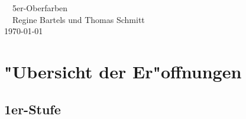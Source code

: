 \newenvironment{reizung}[1][t]%
{%
  \begin{tabular*}{\bidwidth}[#1]{@{}*{3}{l@{\extracolsep{0pt plus 1fil}}}l@{}}%
    West & Nord & Ost & S\"ud \\
    \hline
}
{%
  \end{tabular*}%
}

\newcommand{\reizungmittext}[3][\bidwidth]{%
\mbox{\smaller
\begin{minipage}{#1}
\begin{reizung}
#2
\end{reizung}
\end{minipage}%
\hspace{1.5ex}\vrule\hspace{1.5ex}%
\begin{minipage}{\columnwidth-#1-3ex-0.6pt}%
#3
\end{minipage}
}
}


\setlength{\fboxsep}{1.5ex}
\newcommand\notebox[1]%
{%
\fbox{\parbox{\columnwidth - 3ex}{#1}}%
}

\makeindex
\newcommand{\Index}[1]{#1\index{#1}}

\renewcommand{\sectionmark}[1]{\markleft{#1}}
\pagestyle{fancy}
\fancyhead[RE,LO]{\nouppercase{\emph{\leftmark}}}
\fancyhead[RO,LE]{\thepage}
\fancyfoot{}
\renewcommand{\headrulewidth}{0pt}




\begin{center}
\textsf{{\co{}~~5er-Oberfarben~~\pi\\[1ex]}
\tr{}~~Regine Bartels und Thomas Schmitt~~\ka\\[1ex]
\small \today}
\end{center}
\tableofcontents

%
%
\newpage
\section{"Ubersicht der Er"offnungen}

\subsection*{1er-Stufe}

